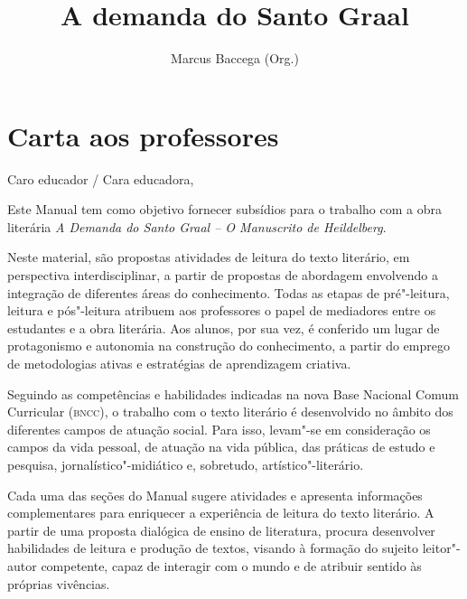 \documentclass{extarticle}
\begin{document}
\newcommand{\AutorLivro}{Marcus Baccega (Org.)}
\newcommand{\TituloLivro}{A demanda do Santo Graal}
\newcommand{\Tema}{Ficção, mistério e fantasia}
\newcommand{\Genero}{Conto, crônica e novela}
\newcommand{\issnppub}{---}
\newcommand{\issnepub}{---}
\newcommand{\colaborador}{\textbf{Clarice Assalim, Bruno Gradella e Vicente Castro} é uma pessoa incrível e vai fazer um bom serviço.}




\title{\TituloLivro}
\author{\AutorLivro}
\def\authornotes{\colaborador}

\date{}
\maketitle
\tableofcontents

\pagebreak

\section{Carta aos professores}

Caro educador / Cara educadora,\\\bigskip

Este Manual tem como objetivo fornecer subsídios para o trabalho com a
obra literária \emph{A Demanda do Santo Graal -- O Manuscrito de
Heildelberg}.

Neste material, são propostas atividades de leitura do texto literário,
em perspectiva interdisciplinar, a partir de propostas de abordagem
envolvendo a integração de diferentes áreas do conhecimento. Todas as
etapas de pré"-leitura, leitura e pós"-leitura atribuem aos professores o
papel de mediadores entre os estudantes e a obra literária. Aos alunos,
por sua vez, é conferido um lugar de protagonismo e autonomia na
construção do conhecimento, a partir do emprego de metodologias ativas e
estratégias de aprendizagem criativa.

Seguindo as competências e habilidades indicadas na nova Base Nacional
Comum Curricular (\textsc{bncc}), o trabalho com o texto literário é desenvolvido
no âmbito dos diferentes campos de atuação social. Para isso, levam"-se
em consideração os campos da vida pessoal, de atuação na vida pública,
das práticas de estudo e pesquisa, jornalístico"-midiático e, sobretudo,
artístico"-literário.

Cada uma das seções do Manual sugere atividades e apresenta informações
complementares para enriquecer a experiência de leitura do texto
literário. A partir de uma proposta dialógica de ensino de literatura,
procura desenvolver habilidades de leitura e produção de textos, visando
à formação do sujeito leitor"-autor competente, capaz de interagir com o
mundo e de atribuir sentido às próprias vivências.
\end{document}
